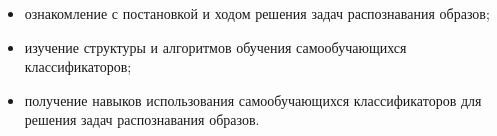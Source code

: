 
\begin{itemize}

	\item ознакомление с постановкой и ходом решения задач распознавания образов;
	\item изучение структуры и алгоритмов обучения самообучающихся классификаторов;
	\item получение навыков использования самообучающихся классификаторов для решения задач распознавания образов.

\end{itemize}

